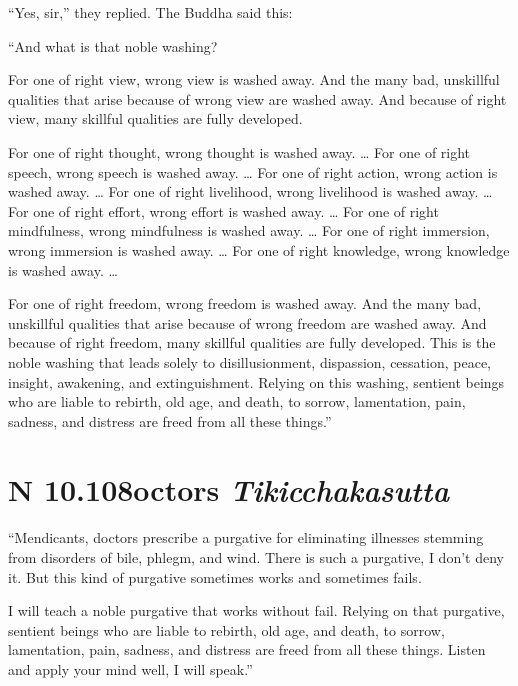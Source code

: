 \documentclass[12pt,openany]{book}%
\newcommand*{\suttatitleacronym}[1]{\smaller[2]{#1}\vspace*{.3em}}
\newcommand*{\suttatitletranslation}[1]{\linebreak{#1}}
\newcommand*{\suttatitleroot}[1]{\linebreak\smaller[2]\itshape{#1}}
\newcommand*{\tocacronym}[1]{\hspace*{-3.3em}{#1}\quad}
\newcommand*{\toctranslation}[1]{#1}
\newcommand*{\tocroot}[1]{(\textit{#1})}
\begin{document}
“Yes, sir,” they replied. The Buddha said this: 

“And what is that noble washing? 

For one of right view, wrong view is washed away. And the many bad, unskillful qualities that arise because of wrong view are washed away. And because of right view, many skillful qualities are fully developed. 

For one of right thought, wrong thought is washed away. … For one of right speech, wrong speech is washed away. … For one of right action, wrong action is washed away. … For one of right livelihood, wrong livelihood is washed away. … For one of right effort, wrong effort is washed away. … For one of right mindfulness, wrong mindfulness is washed away. … For one of right immersion, wrong immersion is washed away. … For one of right knowledge, wrong knowledge is washed away. … 

For one of right freedom, wrong freedom is washed away. And the many bad, unskillful qualities that arise because of wrong freedom are washed away. And because of right freedom, many skillful qualities are fully developed. This is the noble washing that leads solely to disillusionment, dispassion, cessation, peace, insight, awakening, and extinguishment. Relying on this washing, sentient beings who are liable to rebirth, old age, and death, to sorrow, lamentation, pain, sadness, and distress are freed from all these things.” 

%
\section*{{\suttatitleacronym AN 10.108}{\suttatitletranslation Doctors }{\suttatitleroot Tikicchakasutta}}
\addcontentsline{toc}{section}{\tocacronym{AN 10.108} \toctranslation{Doctors } \tocroot{Tikicchakasutta}}

“Mendicants, doctors prescribe a purgative for eliminating illnesses stemming from disorders of bile, phlegm, and wind. There is such a purgative, I don’t deny it. But this kind of purgative sometimes works and sometimes fails. 

I will teach a noble purgative that works without fail. Relying on that purgative, sentient beings who are liable to rebirth, old age, and death, to sorrow, lamentation, pain, sadness, and distress are freed from all these things. Listen and apply your mind well, I will speak.” 
\end{document}
